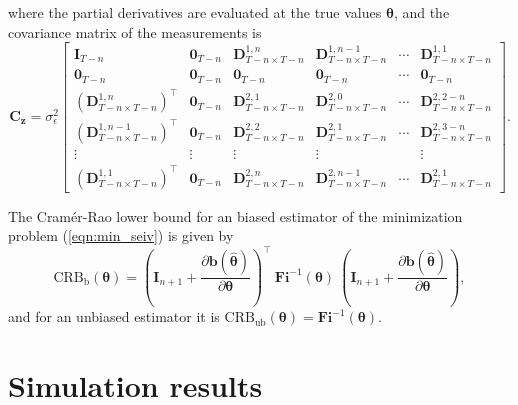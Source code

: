 where the partial derivatives are evaluated at the true values $\bm{\theta}$, and the covariance matrix of the measurements is
\begin{equation} \mathbf{C}_{\mathbf{z}} = \sigma_{\epsilon}^2 \begin{bmatrix} \mathbf{I}_{T-n} & \mathbf{0}_{T-n} & \mathbf{D}_{T-n \times T-n}^{1,n} & \mathbf{D}_{T-n \times T-n}^{1,n-1} & \cdots & \mathbf{D}_{T-n \times T-n}^{1,1} \\ \mathbf{0}_{T-n} & \mathbf{0}_{T-n} & \mathbf{0}_{T-n} & \mathbf{0}_{T-n} & \cdots & \mathbf{0}_{T-n} \\ \left( \mathbf{D}_{T-n \times T-n}^{1,n} \right)^\top & \mathbf{0}_{T-n} & \mathbf{D}_{T-n \times T-n}^{2,1} & \mathbf{D}_{T-n \times T-n}^{2,0} & \cdots & \mathbf{D}_{T-n \times T-n}^{2,2-n} \\ \left( \mathbf{D}_{T-n \times T-n}^{1,n-1} \right)^\top & \mathbf{0}_{T-n} & \mathbf{D}_{T-n \times T-n}^{2,2} & \mathbf{D}_{T-n \times T-n}^{2,1} & \cdots & \mathbf{D}_{T-n \times T-n}^{2,3-n} \\ \vdots & \vdots & \vdots & \vdots & & \vdots \\ \left( \mathbf{D}_{T-n \times T-n}^{1,1} \right)^\top & \mathbf{0}_{T-n} & \mathbf{D}_{T-n \times T-n}^{2,n} & \mathbf{D}_{T-n \times T-n}^{2,n-1} & \cdots & \mathbf{D}_{T-n \times T-n}^{2,1} \end{bmatrix} .
 \label{eqn:Cz} \end{equation} 

The Cram\'er-Rao lower bound for an biased estimator of the minimization problem (\ref{eqn:min_seiv}) is given by
\begin{equation} \mathrm{CRB}_{\mathrm{b}}(\bm{\theta}) = \left( \mathbf{I}_{n+1} + \frac{\partial \mathbf{b} \left( \widehat{\bm{\theta}} \right) }{\partial \bm{\theta} } \right)^\top \ \mathbf{Fi}^{-1}(\bm{\theta}) \ \left( \mathbf{I}_{n+1} + \frac{\partial \mathbf{b} \left( \widehat{\bm{\theta}} \right) }{\partial \bm{\theta} } \right), \label{eqn:CRB_EIV} \end{equation} 
and for an unbiased estimator it is $\mathrm{CRB}_{\mathrm{ub}}(\bm{\theta}) = \mathbf{Fi}^{-1}(\bm{\theta})$.


\section{Simulation results}

